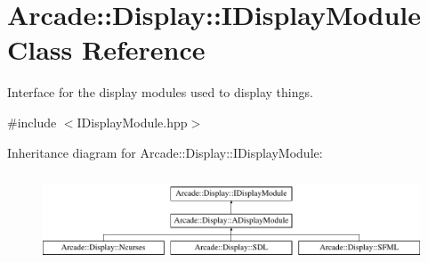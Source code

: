 \hypertarget{classArcade_1_1Display_1_1IDisplayModule}{}\section{Arcade\+::Display\+::I\+Display\+Module Class Reference}
\label{classArcade_1_1Display_1_1IDisplayModule}


Interface for the display modules used to display things.  




{\ttfamily \#include $<$I\+Display\+Module.\+hpp$>$}

Inheritance diagram for Arcade\+::Display\+::I\+Display\+Module\+:\begin{figure}[H]
\begin{center}
\leavevmode
\includegraphics[height=2.679426cm]{classArcade_1_1Display_1_1IDisplayModule}
\end{center}
\end{figure}
